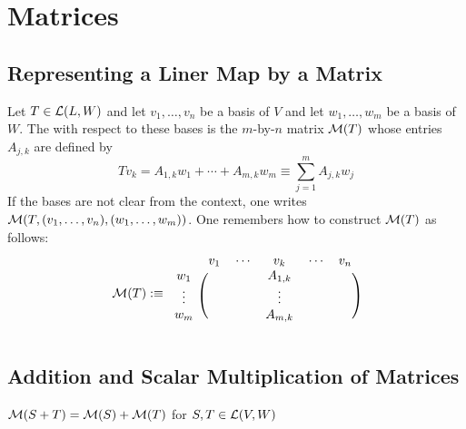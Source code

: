 \section{Matrices}
\subsection{Representing a Liner Map by a Matrix}

\setcounter{thm}{30}
\begin{mydef}
  \label{def: matrix of a linear map}
  Let $T \in \mathcal{L} (L,W)$ and let $v_1, \dots, v_n$ be a basis of $V$ and let $w_1, \dots, w_m$ be a basis of $W$. The  with respect to these bases is the $m$-by-$n$ matrix $\mathcal{M}(T)$ whose entries $A_{j,k}$ are defined by
  \begin{equation}
    T v_k = A_{1,k} w_1 + \cdots + A_{m,k} w_m \equiv \sum_{j=1}^{m} A_{j,k} w_j
  \end{equation}
  If the bases are not clear from the context, one writes $\mathcal{M}(T, (v_1, \dots, v_n),(w_1, \dots, w_m))$. One remembers how to construct $\mathcal{M}(T)$ as follows:
  \begin{equation}
    \mathcal{M} (T) :\equiv
      \begin{blockarray}{cccccc}
                 & v_1 & \cdots & v_k     & \cdots & v_n \\
        \begin{block}{c(ccccc)}
          w_1    &     &        & A_{1,k} &        &     \\
          \vdots &     &        & \vdots  &        &     \\
          w_m    &     &        & A_{m,k} &        &     \\
        \end{block}
      \end{blockarray}
  \end{equation}
\end{mydef}

\subsection{Addition and Scalar Multiplication of Matrices}

\setcounter{thm}{34}
\begin{thm}
  $\mathcal{M}(S+T) = \mathcal{M}(S) + \mathcal{M}(T)$ for $S, T \in \mathcal{L} (V,W)$
\end{thm}

